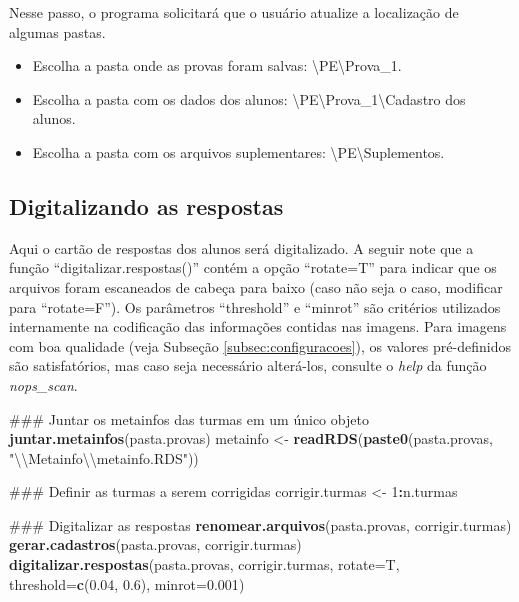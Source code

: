 \documentclass[a4paper]{report}
\newenvironment{Shaded}{\begin{snugshade}}{\end{snugshade}}
\newcommand{\KeywordTok}[1]{\textcolor[rgb]{0.13,0.29,0.53}{\textbf{#1}}}
\newcommand{\DataTypeTok}[1]{\textcolor[rgb]{0.13,0.29,0.53}{#1}}
\newcommand{\DecValTok}[1]{\textcolor[rgb]{0.00,0.00,0.81}{#1}}
\newcommand{\FloatTok}[1]{\textcolor[rgb]{0.00,0.00,0.81}{#1}}
\newcommand{\CharTok}[1]{\textcolor[rgb]{0.31,0.60,0.02}{#1}}
\newcommand{\StringTok}[1]{\textcolor[rgb]{0.31,0.60,0.02}{#1}}
\newcommand{\OperatorTok}[1]{\textcolor[rgb]{0.81,0.36,0.00}{\textbf{#1}}}
\newcommand{\NormalTok}[1]{#1}
\providecommand{\tightlist}{%
  \setlength{\itemsep}{0pt}\setlength{\parskip}{0pt}}
\begin{document}
Nesse passo, o programa solicitará que o usuário atualize a localização
de algumas pastas.

\begin{itemize}
\tightlist
\item
  Escolha a pasta onde as provas foram salvas:
  \textbackslash{}PE\textbackslash{}Prova\_1.
\item
  Escolha a pasta com os dados dos alunos:
  \textbackslash{}PE\textbackslash{}Prova\_1\textbackslash{}Cadastro dos
  alunos.
\item
  Escolha a pasta com os arquivos suplementares:
  \textbackslash{}PE\textbackslash{}Suplementos.
\end{itemize}

\subsection{Digitalizando as respostas}

Aqui o cartão de respostas dos alunos será digitalizado. A seguir note
que a função ``digitalizar.respostas()'' contém a opção ``rotate=T''
para indicar que os arquivos foram escaneados de cabeça para baixo (caso
não seja o caso, modificar para ``rotate=F''). Os parâmetros
``threshold'' e ``minrot'' são critérios utilizados internamente na
codificação das informações contidas nas imagens. Para imagens com boa
qualidade (veja Subseção \ref{subsec:configuracoes}), os valores
pré-definidos são satisfatórios, mas caso seja necessário alterá-los,
consulte o \emph{help} da função \emph{nops\_scan}.

\begin{Shaded}
\begin{Highlighting}[]
\NormalTok{### Juntar os metainfos das turmas em um único objeto}
\KeywordTok{juntar.metainfos}\NormalTok{(pasta.provas)}
\NormalTok{metainfo <-}\StringTok{ }\KeywordTok{readRDS}\NormalTok{(}\KeywordTok{paste0}\NormalTok{(pasta.provas, }\StringTok{"}\CharTok{\textbackslash{}\textbackslash{}}\StringTok{Metainfo}\CharTok{\textbackslash{}\textbackslash{}}\StringTok{metainfo.RDS"}\NormalTok{))}

\NormalTok{### Definir as turmas a serem corrigidas}
\NormalTok{corrigir.turmas <-}\StringTok{ }\DecValTok{1}\OperatorTok{:}\NormalTok{n.turmas}

\NormalTok{### Digitalizar as respostas}
\KeywordTok{renomear.arquivos}\NormalTok{(pasta.provas, corrigir.turmas)}
\KeywordTok{gerar.cadastros}\NormalTok{(pasta.provas, corrigir.turmas)}
\KeywordTok{digitalizar.respostas}\NormalTok{(pasta.provas, corrigir.turmas, }\DataTypeTok{rotate=}\NormalTok{T, }
                      \DataTypeTok{threshold=}\KeywordTok{c}\NormalTok{(}\FloatTok{0.04}\NormalTok{, }\FloatTok{0.6}\NormalTok{),  }\DataTypeTok{minrot=}\FloatTok{0.001}\NormalTok{)}
\end{Highlighting}
\end{Shaded}
\end{document}
